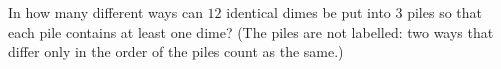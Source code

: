 In how many different ways can $12$ identical dimes be put into $3$ piles so that each pile contains at least one dime? (The piles are not labelled: two ways that differ only in the order of the piles count as the same.)
